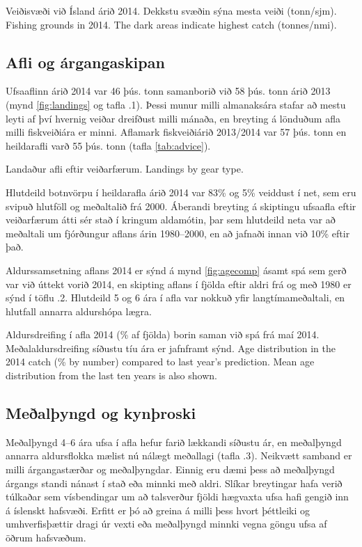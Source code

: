 \documentclass{hafrorep}
\begin{document}
\banner{}

{Veiðisvæði við Ísland árið 2014. Dekkstu svæðin sýna mesta veiði
  (tonn/sjm).}
{Fishing grounds in 2014. The dark areas indicate highest catch
  (tonnes/nmi).}

\subsection{Afli og árgangaskipan}

Ufsaaflinn árið 2014 var 46 þús. tonn samanborið við 58 þús. tonn árið 2013
(mynd \ref{fig:landings} og tafla \tabsection.1). Þessi munur milli almanaksára
stafar að mestu leyti af því hvernig veiðar dreifðust milli mánaða, en breyting
á lönduðum afla milli fiskveiðiára er minni. Aflamark fiskveiðiárið 2013/2014
var 57 þús. tonn en heildarafli varð 55 þús. tonn (tafla \ref{tab:advice}).

{Landaður afli eftir veiðarfærum.}
{Landings by gear type.}



Hlutdeild botnvörpu í heildarafla árið 2014 var 83\% og 5\% veiddust í net, sem
eru svipuð hlutföll og meðaltalið frá 2000. Áberandi breyting á skiptingu
ufsaafla eftir veiðarfærum átti sér stað í kringum aldamótin, þar sem hlutdeild
neta var að meðaltali um fjórðungur aflans árin 1980--2000, en að jafnaði innan
við 10\% eftir það.

Aldurssamsetning aflans 2014 er sýnd á mynd \ref{fig:agecomp} ásamt spá sem gerð
var við úttekt vorið 2014, en skipting aflans í fjölda eftir aldri frá og með
1980 er sýnd í töflu \tabsection.2. Hlutdeild 5 og 6 ára í afla var nokkuð yfir
langtímameðaltali, en hlutfall annarra aldurshópa lægra.

{Aldursdreifing í afla 2014 (\% af fjölda) borin saman við spá frá maí 2014.
  Meðalaldursdreifing síðustu tíu ára er jafnframt sýnd.}
{Age distribution in the 2014 catch (\% by number) compared to last year's
  prediction. Mean age distribution from the last ten years is also shown.}

\subsection{Meðalþyngd og kynþroski}

Meðalþyngd 4--6 ára ufsa í afla hefur farið lækkandi síðustu ár, en meðalþyngd
annarra aldursflokka mælist nú nálægt meðallagi (tafla \tabsection.3). Neikvætt
samband er milli árgangastærðar og meðalþyngdar. Einnig eru dæmi þess að
meðalþyngd árgangs standi nánast í stað eða minnki með aldri. Slíkar breytingar
hafa verið túlkaðar sem vísbendingar um að talsverður fjöldi hægvaxta ufsa hafi
gengið inn á íslenskt hafsvæði. Erfitt er þó að greina á milli þess hvort
þéttleiki og umhverfisþættir dragi úr vexti eða meðalþyngd minnki vegna göngu
ufsa af öðrum hafsvæðum.
\end{document}
